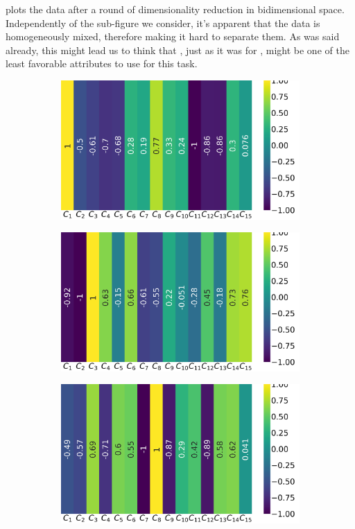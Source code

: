  plots the data after a round of dimensionality reduction in bidimensional
space. Independently of the sub-figure we consider, it's apparent that the data is homogeneously
mixed, therefore making it hard to separate them. As was said already, this might lead us to think
that \phin, just as it was for \bn, might be one of the least favorable attributes to use for this
task.
\begin{figure}[!ht]
	\centering
	\begin{subfigure}{0.49\linewidth}
		\includegraphics[width=\linewidth]{img/qlp_corr/Phi_coil0.png}
	\end{subfigure}
	\begin{subfigure}{0.49\linewidth}
		\includegraphics[width=\linewidth]{img/qlp_corr/Phi_coil1.png}
	\end{subfigure}
	\begin{subfigure}{0.49\linewidth}
		\includegraphics[width=\linewidth]{img/qlp_corr/Phi_coil2.png}

\end{subfigure}
\end{figure}
